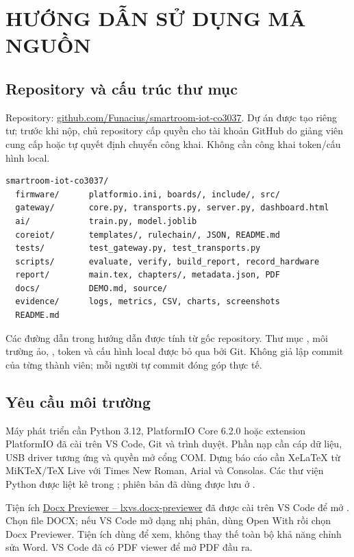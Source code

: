 \chapter{HƯỚNG DẪN SỬ DỤNG MÃ NGUỒN}
\section{Repository và cấu trúc thư mục}
Repository: \href{\RepoURL}{github.com/Funacius/smartroom-iot-co3037}. Dự án được tạo riêng tư; trước khi nộp, chủ repository cấp quyền cho tài khoản GitHub do giảng viên cung cấp hoặc tự quyết định chuyển công khai. Không cần công khai token/cấu hình local.
\begin{verbatim}
smartroom-iot-co3037/
  firmware/      platformio.ini, boards/, include/, src/
  gateway/       core.py, transports.py, server.py, dashboard.html
  ai/            train.py, model.joblib
  coreiot/       templates/, rulechain/, JSON, README.md
  tests/         test_gateway.py, test_transports.py
  scripts/       evaluate, verify, build_report, record_hardware
  report/        main.tex, chapters/, metadata.json, PDF
  docs/          DEMO.md, source/
  evidence/      logs, metrics, CSV, charts, screenshots
  README.md
\end{verbatim}
Các đường dẫn trong hướng dẫn được tính từ gốc repository. Thư mục , môi trường ảo, , token và cấu hình local được bỏ qua bởi Git. Không giả lập commit của từng thành viên; mỗi người tự commit đóng góp thực tế.

\section{Yêu cầu môi trường}
Máy phát triển cần Python 3.12, PlatformIO Core 6.2.0 hoặc extension PlatformIO đã cài trên VS Code, Git và trình duyệt. Phần nạp cần cáp dữ liệu, USB driver tương ứng và quyền mở cổng COM. Dựng báo cáo cần XeLaTeX từ MiKTeX/TeX Live với Times New Roman, Arial và Consolas. Các thư viện Python được liệt kê trong ; phiên bản đã dùng được lưu ở .

Tiện ích \href{https://marketplace.visualstudio.com/items?itemName=lxvs.docx-previewer}{Docx Previewer -- lxvs.docx-previewer} đã được cài trên VS Code để mở . Chọn file DOCX; nếu VS Code mở dạng nhị phân, dùng Open With rồi chọn Docx Previewer. Tiện ích dùng để xem, không thay thế toàn bộ khả năng chỉnh sửa Word. VS Code đã có PDF viewer để mở PDF đầu ra.

